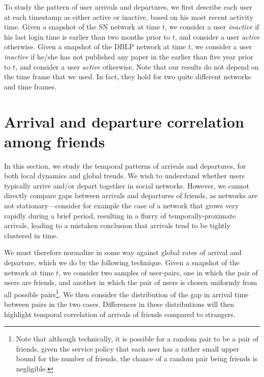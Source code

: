 \documentclass[phd,tocprelim]{cornell}
\begin{document}
To study the pattern of user arrivals and departures, we first
describe each user at each timestamp as either active or inactive,
based on his most recent activity time. Given a snapshot of the SN network
at time $t$, we consider a user \emph{inactive} if his last login time
is earlier than two months prior to $t$, and consider a user
\emph{active} otherwise. Given a snapshot of the DBLP network
at time $t$, we consider a user \emph{inactive} if he/she has not published any 
paper in the earlier than five year prior to $t$, and consider a user
\emph{active} otherwise. Note that our results do not depend on the time frame that we used. In fact, they hold for two quite different networks and time frames.

\section{Arrival and departure correlation among friends}
In this section, we study the temporal patterns of arrivals and
departures, for both local dynamics and global trends.  We wish to understand whether users typically arrive
and/or depart together in social networks.  However, we cannot
directly compare gaps between arrivals and departures of friends, as
networks are not stationary---consider for example the case of a
network that grows very rapidly during a brief period, resulting in a
flurry of temporally-proximate arrivals, leading to a mistaken
conclusion that arrivals tend to be tightly clustered in time.

We must therefore normalize in some way against global rates of
arrival and departure, which we do by the following technique. Given a snapshot of the network at time $t$, we
consider two samples of user-pairs, one in which the pair of users are
friends, and another in which the pair of users is chosen uniformly
from all possible pairs\footnote{Note that although technically, it is possible for a random pair to be a pair of friends, 
given the service policy that each user has a rather small upper bound for the number of friends, the chance of a random pair being friends is negligible.}.  We then consider the distribution of the gap in arrival time between pairs in the two cases.  Differences in these
distributions will then highlight temporal correlation of arrivals of
friends compared to strangers.
\end{document}
